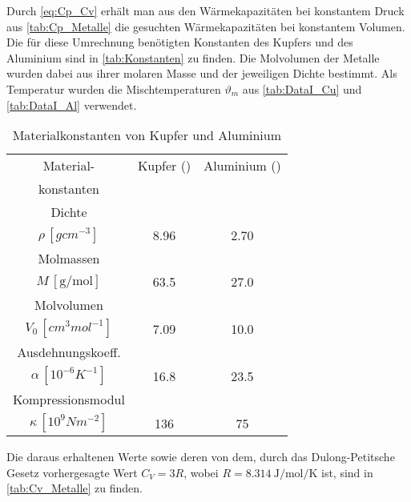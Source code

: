 	Durch \eqref{eq:Cp_Cv} erhält man aus den Wärmekapazitäten bei konstantem Druck aus \autoref{tab:Cp_Metalle} die gesuchten 
	Wärmekapazitäten bei konstantem Volumen. Die für diese Umrechnung benötigten Konstanten des Kupfers und des Aluminium sind 
	in \autoref{tab:Konstanten} zu finden. Die Molvolumen der Metalle wurden dabei aus ihrer molaren Masse und der jeweiligen Dichte
	bestimmt. Als Temperatur wurden die Mischtemperaturen $\vartheta_{m}$ aus \autoref{tab:DataI_Cu} und \ref{tab:DataI_Al} verwendet.
	\begin{table}[!h]
		\centering
		\begin{tabular}{|c||c|c|}
			\hline
			           Material-            & Kupfer (\ce{Cu}) & Aluminium (\ce{Al}) \\
			          konstanten            &                  &  \\ \hline\hline
			            Dichte              &                  &  \\
			    $\rho\,[\si{gcm^{-3}}]$     &    \num{8.96}    &     \num{2.70}      \\ \hline
			           Molmassen            &                  &  \\
			    $M\,[\si{\g\per\mol}]$      &    \num{63.5}    &     \num{27.0}      \\ \hline
			          Molvolumen            &                  &  \\
			$V_{0}\,[\si{cm^{3}mol^{-1}}]$  &    \num{7.09}    &     \num{10.0}      \\ \hline
			Ausdehnungskoeff.\footnotemark  &                  &  \\
			$\alpha\,[\si{10^{-6}K^{-1}}]$  &    \num{16.8}    &     \num{23.5}      \\ \hline
			       Kompressionsmodul        &                  &  \\
			$\kappa\,[\si{10^{9} Nm^{-2}}]$ &    \num{136}     &      \num{75}       \\ \hline
		\end{tabular}
		\caption{Materialkonstanten von Kupfer und Aluminium \label{tab:Konstanten}}
	\end{table}

	Die daraus erhaltenen Werte sowie deren  von dem, durch das Dulong-Petitsche Gesetz vorhergesagte Wert $C_{V} = 3R$,
	wobei $R = \SI{8.314}{\joule\per\mol\per\kelvin}$ \cite{Kuchling07} ist, sind in \autoref{tab:Cv_Metalle} zu finden.
	
